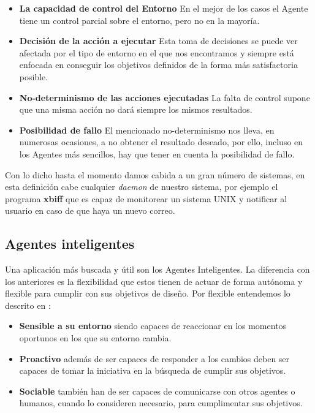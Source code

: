 \begin{itemize}
	\item\textbf{La capacidad de control del Entorno} En el mejor de los casos el Agente tiene un control parcial sobre el entorno, pero no en la mayoría.
	\item\textbf{Decisión de la acción a ejecutar} Esta toma de decisiones se puede ver afectada por el tipo de entorno en el que nos encontramos y siempre está enfocada en conseguir los objetivos definidos de la forma más satisfactoria posible.
	\item\textbf{No-determinismo de las acciones ejecutadas} La falta de control supone que una misma acción no dará siempre los mismos resultados.
	\item\textbf{Posibilidad de fallo} El mencionado no-determinismo nos lleva, en numerosas ocasiones, a no obtener el resultado deseado, por ello, incluso en los Agentes más sencillos, hay que tener en cuenta la posibilidad de fallo.
\end{itemize}

Con lo dicho hasta el momento damos cabida a un gran número de sistemas, en esta definición cabe cualquier \textit{daemon} de nuestro sistema, por ejemplo el programa \textbf{xbiff} que es capaz de monitorear un sistema UNIX y notificar al usuario en caso de que haya un nuevo correo.

\subsection{Agentes inteligentes}

Una aplicación más buscada y útil son los Agentes Inteligentes. La diferencia con los anteriores es la flexibilidad que estos tienen de actuar de forma autónoma y flexible para cumplir con sus objetivos de diseño. Por flexible entendemos lo descrito en \cite{jennings1998agent}:

\begin{itemize}
	\item\textbf{Sensible a su entorno} siendo capaces de reaccionar en los momentos oportunos en los que su entorno cambia.
	\item\textbf{Proactivo} además de ser capaces de responder a los cambios deben ser capaces de tomar la iniciativa en la búsqueda de cumplir sus objetivos.
	\item\textbf{Sociable} también han de ser capaces de comunicarse con otros agentes o humanos, cuando lo consideren necesario, para cumplimentar sus objetivos.
\end{itemize}

